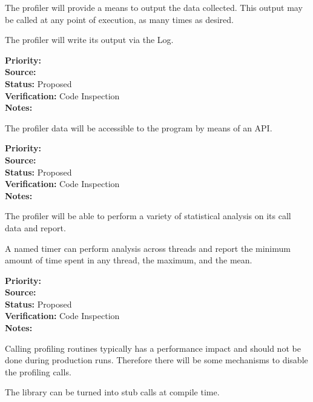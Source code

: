 The profiler will provide a means to output the data collected.  This output may
be called at any point of execution, as many times as desired.


The profiler will write its output via the Log.  

\begin{reqlist}
{\bf Priority:}  \\
{\bf Source:}  \\
{\bf Status:} Proposed \\
{\bf Verification:} Code Inspection \\
{\bf Notes:} 
\end{reqlist}


The profiler data will be accessible to the program by means of an API.
\begin{reqlist}
{\bf Priority:}  \\
{\bf Source:}  \\
{\bf Status:} Proposed \\
{\bf Verification:} Code Inspection \\
{\bf Notes:} 
\end{reqlist}


The profiler will be able to perform a variety of statistical analysis on its call
data and report.


A named timer can perform analysis across threads and report the 
minimum amount of time spent in any thread, the maximum, and the mean.

\begin{reqlist}
{\bf Priority:}  \\
{\bf Source:}  \\
{\bf Status:} Proposed \\
{\bf Verification:} Code Inspection \\
{\bf Notes:} 
\end{reqlist}


Calling profiling routines typically has a performance impact and should not
be done during production runs.  Therefore there will be some mechanisms to 
disable the profiling calls.


The library can be turned into stub calls at compile time.

